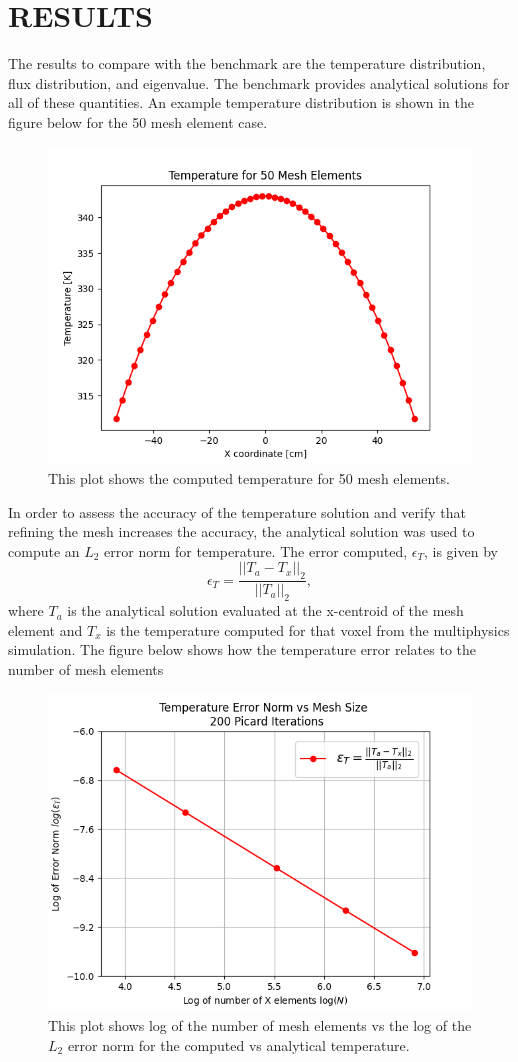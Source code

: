 \documentclass[letterpaper]{mc2023}
\begin{document}
\section{RESULTS}\label{sec:results}
The results to compare with the benchmark are the temperature distribution, flux distribution, and eigenvalue. The benchmark provides
analytical solutions for all of these quantities. An example temperature distribution is shown in the figure below for the 50 mesh element case.
\begin{figure}[H]
    \centering
    \includegraphics[width=0.55\linewidth]{figures/temp_50.png}
    \caption{This plot shows the computed temperature for 50 mesh elements.}
    \label{fig:temp50}
\end{figure}
In order to assess the accuracy of the temperature solution and verify that refining the mesh increases the accuracy, the analytical solution
was used to compute an $L_{2}$ error norm for temperature. The error computed, $\epsilon_{T}$, is given by
\begin{equation}
    \epsilon_{T} = \frac{|| T_{a} - T_{x} ||_{2}}{|| T_{a} ||_{2}},
\end{equation}
where $T_{a}$ is the analytical solution evaluated at the x-centroid of the mesh element and $T_{x}$ is the temperature computed for that
voxel from the multiphysics simulation. The figure below shows how the temperature error relates to the number of mesh elements
\begin{figure}[H]
    \centering
    \includegraphics[width=0.45\linewidth]{figures/temp_error_norms.png}
    \caption{This plot shows log of the number of mesh elements vs the log of the $L_{2}$ error norm for the computed vs analytical temperature.}
    \label{fig:temp_error_study}
\end{figure}
\end{document}
